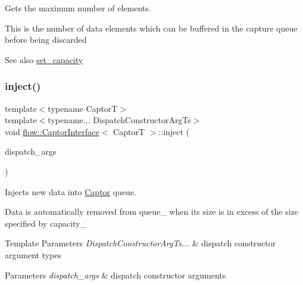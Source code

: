 Gets the maximum number of elements. 

This is the number of data elements which can be buffered in the capture queue before being discarded

\begin{DoxySeeAlso}{See also}
{\ttfamily \hyperlink{classflow_1_1_captor_interface_a8068310b1ece5c53a11252919a62355a}{set\+\_\+capacity}} 
\end{DoxySeeAlso}
\mbox{\label{classflow_1_1_captor_interface_a2a7e884dff7564478a6ae060b37351f0}} 
\subsubsection{\texorpdfstring{inject()}{inject()}}
{\footnotesize\ttfamily template$<$typename CaptorT$>$ \\
template$<$typename... Dispatch\+Constructor\+Arg\+Ts$>$ \\
void \hyperlink{classflow_1_1_captor_interface}{flow\+::\+Captor\+Interface}$<$ CaptorT $>$\+::inject (\begin{DoxyParamCaption}\item[{Dispatch\+Constructor\+Arg\+Ts \&\&...}]{dispatch\+\_\+args }\end{DoxyParamCaption})\hspace{0.3cm}{\ttfamily [inline]}}



Injects new data into \hyperlink{classflow_1_1_captor}{Captor} queue. 

Data is automatically removed from {\ttfamily queue\+\_\+} when its size is in excess of the size specified by {\ttfamily capacity\+\_\+}


\begin{DoxyTemplParams}{Template Parameters}
{\em Dispatch\+Constructor\+Arg\+Ts...} & dispatch constructor argument types\\
\hline
\end{DoxyTemplParams}

\begin{DoxyParams}{Parameters}
{\em dispatch\+\_\+args} & dispatch constructor arguments \\
\hline
\end{DoxyParams}
\mbox{\label{classflow_1_1_captor_interface_a545a4d188f6069261854c9753893fa98}} 
